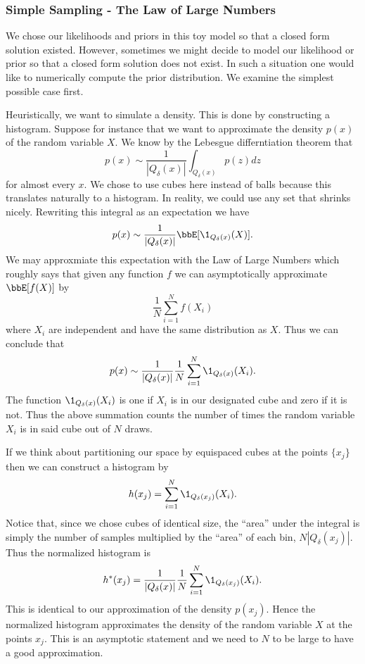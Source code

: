\documentclass{report}
\begin{document}
\subsubsection{Simple Sampling - The Law of Large Numbers}

We chose our likelihoods and priors in this toy model so that a closed form solution existed.  However, sometimes we might decide to model our likelihood or prior so that a closed form solution does not exist.  In such a situation one would like to numerically compute the prior distribution.  We examine the simplest possible case first.

Heuristically, we want to simulate a density.  This is done by constructing a histogram.  Suppose for instance that we want to approximate the density $p(x)$ of the random variable $X$.  We know by the Lebesgue differntiation theorem that
\[
p(x) \sim \frac{1}{|Q_\delta(x)|} \int_{Q_\delta(x)} p(z) dz
\]
for almost every $x$.  We chose to use cubes here instead of balls because this translates naturally to a histogram.  In reality, we could use any set that shrinks nicely.  Rewriting this integral as an expectation we have
\[
p(x) \sim \frac{1}{|Q_\delta(x)|} \bbE[ \1_{Q_\delta(x)}(X) ].
\]
We may approxmiate this expectation with the Law of Large Numbers which roughly says that given any function $f$ we can asymptotically approximate $\bbE[f(X)]$ by
\[
\frac{1}{N} \sum_{i=1}^N f(X_i)
\]
where $X_i$ are independent and have the same distribution as $X$.  Thus we can conclude that
\[
p(x) \sim \frac{1}{|Q_\delta(x)|} \frac{1}{N} \sum_{i=1}^N \1_{Q_\delta(x)} (X_i).
\]
The function $\1_{Q_\delta(x)}(X_i)$ is one if $X_i$ is in our designated cube and zero if it is not.  Thus the above summation counts the number of times the random variable $X_i$ is in said cube out of $N$ draws.

If we think about partitioning our space by equispaced cubes at the points $\{x_j\}$ then we can construct a histogram by
\[
h(x_j) = \sum_{i=1}^N \1_{Q_\delta(x_j)}(X_i).
\]
Notice that, since we chose cubes of identical size, the ``area'' under the integral is simply the number of samples multiplied by the ``area'' of each bin, $N | Q_\delta(x_j) |$.  Thus the normalized histogram is
\[
h^*(x_j) = \frac{1}{|Q_\delta(x)|}\frac{1}{N} \sum_{i=1}^N \1_{Q_\delta(x_j)}(X_i).
\]
This is identical to our approximation of the density $p(x_j)$.  Hence the normalized histogram approximates the density of the random variable $X$ at the points $x_j$.  This is an asymptotic statement and we need to $N$ to be large to have a good approximation.
\end{document}
